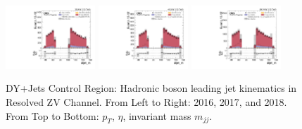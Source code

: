 \begin{figure}[!ht]
  \includegraphics[width=0.30\textwidth]{analysis_plots/2016_zjj/cr_vjets_l/dijet_m.pdf}
  \includegraphics[width=0.30\textwidth]{analysis_plots/2017_zjj/cr_vjets_l/dijet_m.pdf}
  \includegraphics[width=0.30\textwidth]{analysis_plots/2018_zjj/cr_vjets_l/dijet_m.pdf} \\
  \caption[DY+Jets Control Region: Hadronic boson leading jet kinematics in Resolved ZV Channel]%
  {DY+Jets Control Region: Hadronic boson leading jet kinematics in Resolved ZV Channel. From Left to Right: 2016,
    2017, and 2018. From Top to Bottom: \( p_T \), \( \eta \), invariant mass \( m_{jj} \).}%
  \label{fig:zjj-cr-vjets-l-dijet1-pt-eta-m}
\end{figure}

